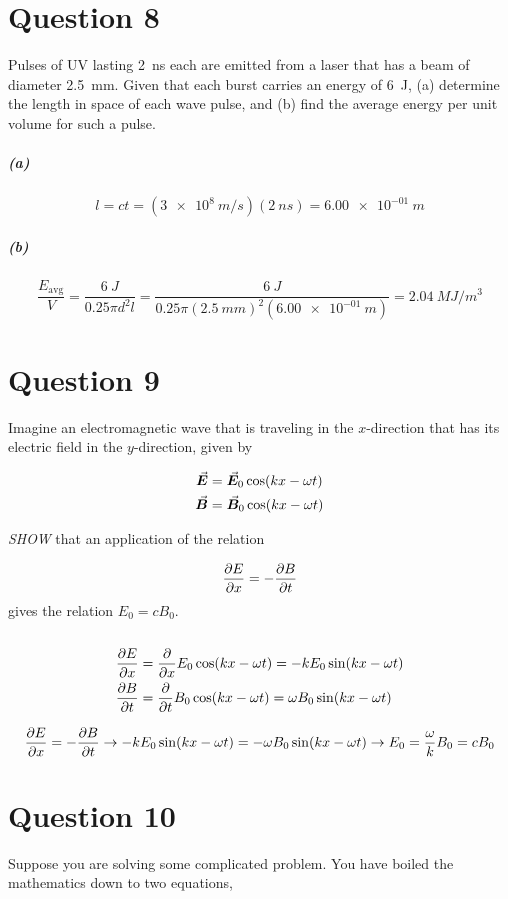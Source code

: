 \documentclass[a4paper]{article}
\begin{document}
\section*{Question 8}
Pulses of UV lasting \qty{2}{ns} each are emitted from a laser that has a beam of diameter \qty{2.5}{mm}. Given
that each burst carries an energy of \qty{6}{J}, (a) determine the length in space of each wave pulse, and (b)
find the average energy per unit volume for such a pulse.

\subparagraph*{(a)}
\[
    l = c t = (\qty{3e8}{m \per s}) (\qty{2}{ns}) = \qty{6.00e-01}{m}
\]

\subparagraph*{(b)}
\[
    \frac{E_{\textrm{avg}}}{V} = \frac{\qty{6}{J}}{0.25 \pi d^2 l} = \frac{\qty{6}{J}}{0.25 \pi (\qty{2.5}{mm})^2 (\qty{6.00e-01}{m})} = \qty{2.04}{MJ \per m^3}
\]

\section*{Question 9}
Imagine an electromagnetic wave that is traveling in the $x$-direction that has its electric field in the
$y$-direction, given by

\begin{gather*}
    \va*{E} = \va*{E}_0 \cos(kx - \omega t) \\
    \va*{B} = \va*{B}_0 \cos(kx - \omega t)
\end{gather*}

\textit{SHOW} that an application of the relation

\[
    \pdv{E}{x} = - \pdv{B}{t}  
\]
gives the relation $E_0 = c B_0$. \\\\

\begin{align*}
    \pdv{E}{x} &= \pdv{x} E_0 \cos(kx - \omega t) = - k E_0 \sin(kx - \omega t) \\
    \pdv{B}{t} &= \pdv{t} B_0 \cos(kx - \omega t) = \omega B_0 \sin(kx - \omega t)
\end{align*}

\[
    \pdv{E}{x} = - \pdv{B}{t} \rightarrow - k E_0 \sin(kx - \omega t) = -\omega B_0 \sin(kx - \omega t) \rightarrow E_0 = \frac{\omega}{k} B_0 = c B_0
\]

\section*{Question 10}
Suppose you are solving some complicated problem. You have boiled the mathematics down to two
equations,
\end{document}
